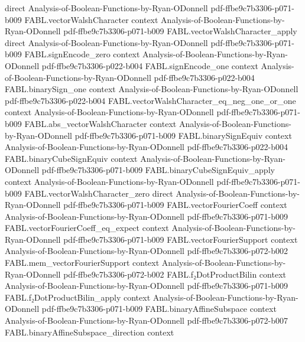 \begin{theorem}
  {direct}
  {Analysis-of-Boolean-Functions-by-Ryan-ODonnell}
  {pdf-ffbe9c7b3306-p071-b009}
\proofstep
  {FABL.vectorWalshCharacter}
  {context}
  {Analysis-of-Boolean-Functions-by-Ryan-ODonnell}
  {pdf-ffbe9c7b3306-p071-b009}
\proofstep
  {FABL.vectorWalshCharacter_apply}
  {direct}
  {Analysis-of-Boolean-Functions-by-Ryan-ODonnell}
  {pdf-ffbe9c7b3306-p071-b009}
\proofstep
  {FABL.signEncode_zero}
  {context}
  {Analysis-of-Boolean-Functions-by-Ryan-ODonnell}
  {pdf-ffbe9c7b3306-p022-b004}
\proofstep
  {FABL.signEncode_one}
  {context}
  {Analysis-of-Boolean-Functions-by-Ryan-ODonnell}
  {pdf-ffbe9c7b3306-p022-b004}
\proofstep
  {FABL.binarySign_one}
  {context}
  {Analysis-of-Boolean-Functions-by-Ryan-ODonnell}
  {pdf-ffbe9c7b3306-p022-b004}
\proofstep
  {FABL.vectorWalshCharacter_eq_neg_one_or_one}
  {context}
  {Analysis-of-Boolean-Functions-by-Ryan-ODonnell}
  {pdf-ffbe9c7b3306-p071-b009}
\proofstep
  {FABL.abs_vectorWalshCharacter}
  {context}
  {Analysis-of-Boolean-Functions-by-Ryan-ODonnell}
  {pdf-ffbe9c7b3306-p071-b009}
\proofstep
  {FABL.binarySignEquiv}
  {context}
  {Analysis-of-Boolean-Functions-by-Ryan-ODonnell}
  {pdf-ffbe9c7b3306-p022-b004}
\proofstep
  {FABL.binaryCubeSignEquiv}
  {context}
  {Analysis-of-Boolean-Functions-by-Ryan-ODonnell}
  {pdf-ffbe9c7b3306-p071-b009}
\proofstep
  {FABL.binaryCubeSignEquiv_apply}
  {context}
  {Analysis-of-Boolean-Functions-by-Ryan-ODonnell}
  {pdf-ffbe9c7b3306-p071-b009}
\proofstep
  {FABL.vectorWalshCharacter_zero}
  {direct}
  {Analysis-of-Boolean-Functions-by-Ryan-ODonnell}
  {pdf-ffbe9c7b3306-p071-b009}
\proofstep
  {FABL.vectorFourierCoeff}
  {context}
  {Analysis-of-Boolean-Functions-by-Ryan-ODonnell}
  {pdf-ffbe9c7b3306-p071-b009}
\proofstep
  {FABL.vectorFourierCoeff_eq_expect}
  {context}
  {Analysis-of-Boolean-Functions-by-Ryan-ODonnell}
  {pdf-ffbe9c7b3306-p071-b009}
\proofstep
  {FABL.vectorFourierSupport}
  {context}
  {Analysis-of-Boolean-Functions-by-Ryan-ODonnell}
  {pdf-ffbe9c7b3306-p072-b002}
\proofstep
  {FABL.mem_vectorFourierSupport}
  {context}
  {Analysis-of-Boolean-Functions-by-Ryan-ODonnell}
  {pdf-ffbe9c7b3306-p072-b002}
\proofstep
  {FABL.f₂DotProductBilin}
  {context}
  {Analysis-of-Boolean-Functions-by-Ryan-ODonnell}
  {pdf-ffbe9c7b3306-p071-b009}
\proofstep
  {FABL.f₂DotProductBilin_apply}
  {context}
  {Analysis-of-Boolean-Functions-by-Ryan-ODonnell}
  {pdf-ffbe9c7b3306-p071-b009}
\proofstep
  {FABL.binaryAffineSubspace}
  {context}
  {Analysis-of-Boolean-Functions-by-Ryan-ODonnell}
  {pdf-ffbe9c7b3306-p072-b007}
\proofstep
  {FABL.binaryAffineSubspace_direction}
  {context}

\end{theorem}

